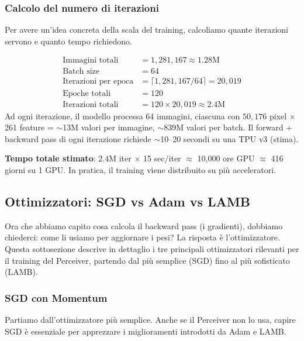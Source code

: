 \documentclass[12pt,a4paper]{article}
\begin{document}
\subsubsection{Calcolo del numero di iterazioni} \label{sec:num_iterazioni}

Per avere un'idea concreta della scala del training, calcoliamo quante iterazioni servono e quanto tempo richiedono.

\begin{examplebox}
\begin{align*}
    \text{Immagini totali} &= 1{,}281{,}167 \approx 1.28\text{M} \\
    \text{Batch size} &= 64 \\
    \text{Iterazioni per epoca} &= \lceil 1{,}281{,}167 / 64 \rceil = 20{,}019 \\
    \text{Epoche totali} &= 120 \\
    \text{Iterazioni totali} &= 120 \times 20{,}019 \approx 2.4\text{M}
\end{align*}
Ad ogni iterazione, il modello processa 64 immagini, ciascuna con $50{,}176$ pixel $\times$ 261 feature = $\sim$13M valori per immagine, $\sim$839M valori per batch. Il forward + backward pass di ogni iterazione richiede $\sim$10--20 secondi su una TPU v3 (stima).

\textbf{Tempo totale stimato}: $2.4$M iter $\times$ 15 sec/iter $\approx$ 10{,}000 ore GPU $\approx$ 416 giorni su 1 GPU. In pratica, il training viene distribuito su pi\`u acceleratori.
\end{examplebox}


\subsection{Ottimizzatori: SGD vs Adam vs LAMB} \label{sec:ottimizzatori}

Ora che abbiamo capito cosa calcola il backward pass (i gradienti), dobbiamo chiederci: come li usiamo per aggiornare i pesi? La risposta \`e l'ottimizzatore. Questa sottosezione descrive in dettaglio i tre principali ottimizzatori rilevanti per il training del Perceiver, partendo dal pi\`u semplice (SGD) fino al pi\`u sofisticato (LAMB).

\subsubsection{SGD con Momentum}

Partiamo dall'ottimizzatore pi\`u semplice. Anche se il Perceiver non lo usa, capire SGD \`e essenziale per apprezzare i miglioramenti introdotti da Adam e LAMB.
\end{document}
